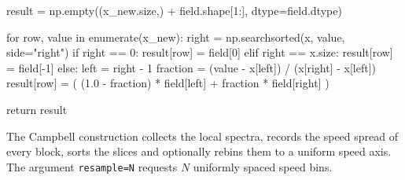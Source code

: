 \begin{python}
    result = np.empty((x_new.size,) + field.shape[1:], dtype=field.dtype)

    for row, value in enumerate(x_new):
        right = np.searchsorted(x, value, side="right")
        if right == 0:
            result[row] = field[0]
        elif right == x.size:
            result[row] = field[-1]
        else:
            left = right - 1
            fraction = (value - x[left]) / (x[right] - x[left])
            result[row] = (
                (1.0 - fraction) * field[left]
                + fraction * field[right]
            )

    return result
\end{python}

The Campbell construction collects the local spectra, records the speed spread
of every block, sorts the slices and optionally rebins them to a uniform speed
axis. The argument \texttt{resample=N} requests $ N $ uniformly spaced speed
bins.


